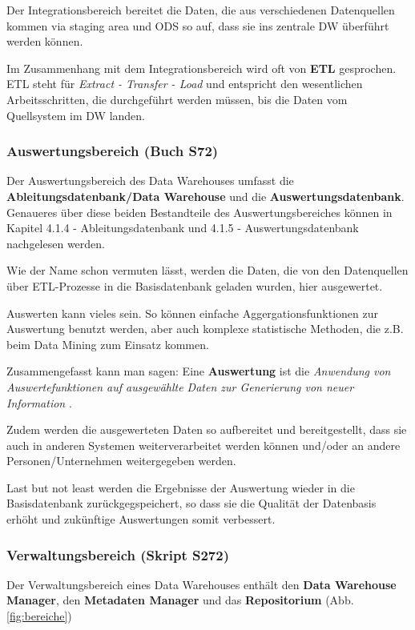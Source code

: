 \documentclass[a4paper, 11pt, nofootinbib]{article}
\begin{document}
Der Integrationsbereich bereitet die Daten, die aus verschiedenen Datenquellen kommen via staging area und ODS so auf, dass sie ins zentrale DW überführt werden können. 

Im Zusammenhang mit dem Integrationsbereich wird oft von \textbf{ETL} gesprochen. ETL steht für \textit{Extract - Transfer - Load} und entspricht den wesentlichen Arbeitsschritten, die durchgeführt werden müssen, bis die Daten vom Quellsystem im DW landen.



\subsubsection{Auswertungsbereich (Buch S72)}
Der Auswertungsbereich des Data Warehouses umfasst die \textbf{Ableitungsdatenbank/Data Warehouse} und die \textbf{Auswertungsdatenbank}. Genaueres über diese beiden Bestandteile des Auswertungsbereiches können in Kapitel 4.1.4 - Ableitungsdatenbank und 4.1.5 - Auswertungsdatenbank nachgelesen werden.

\vspace{10px}

\noindent Wie der Name schon vermuten lässt, werden die Daten, die von den Datenquellen über ETL-Prozesse in die Basisdatenbank geladen wurden, hier ausgewertet. 

Auswerten kann vieles sein. So können einfache Aggergationsfunktionen zur Auswertung benutzt werden, aber auch komplexe statistische Methoden, die z.B. beim Data Mining zum Einsatz kommen.

Zusammengefasst kann man sagen: Eine \textbf{Auswertung} ist die \textit{Anwendung von Auswertefunktionen auf ausgewählte Daten zur Generierung von neuer Information} .

Zudem werden die ausgewerteten Daten so aufbereitet und bereitgestellt, dass sie auch in anderen Systemen weiterverarbeitet werden können und/oder an andere Personen/Unternehmen weitergegeben werden.

Last but not least werden die Ergebnisse der Auswertung wieder in die Basisdatenbank zurückgegspeichert, so dass sie die Qualität der Datenbasis erhöht und zukünftige Auswertungen somit verbessert. 



\subsubsection{Verwaltungsbereich (Skript S272)}
Der Verwaltungsbereich eines Data Warehouses enthält den \textbf{Data Warehouse Manager}, den \textbf{Metadaten Manager} und das \textbf{Repositorium} (Abb. \ref{fig:bereiche})
\end{document}

